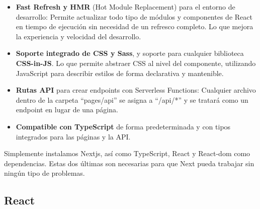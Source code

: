 \documentclass[12pt,twoside,titlepage]{report}
\begin{document}
\begin{itemize}
    \item \textbf{Fast Refresh y HMR} (Hot Module Replacement) para el entorno de desarrollo: Permite actualizar todo tipo de módulos y componentes de React en tiempo de ejecución sin necesidad de un refresco completo. Lo que mejora la experiencia y velocidad del desarrollo.

    \item \textbf{Soporte integrado de CSS y Sass}, y soporte para cualquier biblioteca \textbf{CSS-in-JS}. Lo que permite abstraer CSS al nivel del componente, utilizando JavaScript para describir estilos de forma declarativa y mantenible.
    \item \textbf{Rutas API} para crear endpoints con Serverless Functions: Cualquier archivo dentro de la carpeta ``pages/api'' se asigna a ``/api/*'' y se tratará como un endpoint en lugar de una página.
    \item \textbf{Compatible con TypeScript} de forma predeterminada y con tipos integrados para las páginas y la API.
\end{itemize}

Simplemente instalamos Nextjs, así como TypeScript, React y React-dom como dependencias. Estas dos últimas son necesarias para que Next pueda trabajar sin ningún tipo de problemas.

\subsection{React}
\label{sec:React}
\end{document}

